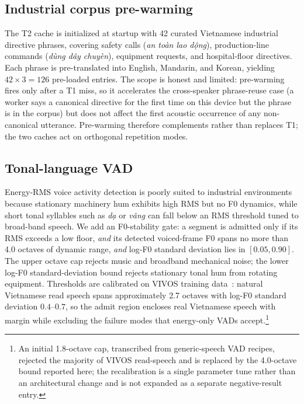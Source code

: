 \documentclass[a4paper,fleqn]{cas-dc}
\begin{document}
\subsection{Industrial corpus pre-warming}\label{sec:method:prewarm}

The T2 cache is initialized at startup with 42 curated Vietnamese industrial directive phrases, covering safety calls (\emph{an to\`an lao d\d{\^o}ng}), production-line commands (\emph{d\`ung d\^ay chuy\`en}), equipment requests, and hospital-floor directives. Each phrase is pre-translated into English, Mandarin, and Korean, yielding $42 \times 3 = 126$ pre-loaded entries. The scope is honest and limited: pre-warming fires only after a T1 miss, so it accelerates the cross-speaker phrase-reuse case (a worker says a canonical directive for the first time on this device but the phrase is in the corpus) but does not affect the first acoustic occurrence of any non-canonical utterance. Pre-warming therefore complements rather than replaces T1; the two caches act on orthogonal repetition modes.

\subsection{Tonal-language VAD}\label{sec:method:tonevad}

Energy-RMS voice activity detection is poorly suited to industrial environments because stationary machinery hum exhibits high RMS but no F0 dynamics, while short tonal syllables such as \emph{d\d{a}} or \emph{v\^ang} can fall below an RMS threshold tuned to broad-band speech. We add an F0-stability gate: a segment is admitted only if its RMS exceeds a low floor, \emph{and} its detected voiced-frame F0 spans no more than 4.0 octaves of dynamic range, \emph{and} log-F0 standard deviation lies in $[0.05, 0.90]$. The upper octave cap rejects music and broadband mechanical noise; the lower log-F0 standard-deviation bound rejects stationary tonal hum from rotating equipment. Thresholds are calibrated on VIVOS training data~\citep{luong2016vivos}: natural Vietnamese read speech spans approximately 2.7 octaves with log-F0 standard deviation $0.4$--$0.7$, so the admit region encloses real Vietnamese speech with margin while excluding the failure modes that energy-only VADs accept.\footnote{An initial 1.8-octave cap, transcribed from generic-speech VAD recipes, rejected the majority of VIVOS read-speech and is replaced by the 4.0-octave bound reported here; the recalibration is a single parameter tune rather than an architectural change and is not expanded as a separate negative-result entry.}
\end{document}
